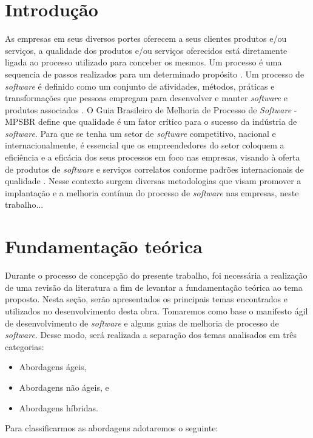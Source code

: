 \documentclass{acm_proc_article-sp}
\begin{document}
\section{Introdução}
As empresas em seus diversos portes oferecem a seus clientes produtos e/ou serviços, a qualidade dos produtos e/ou serviços oferecidos está diretamente ligada ao processo utilizado para conceber os mesmos. Um processo é uma sequencia de passos realizados para um determinado propósito \cite{ieee}. Um processo de \textit{software} é definido como um conjunto de atividades, métodos, práticas e transformações que pessoas empregam para desenvolver e manter \textit{software} e produtos associados \cite{weber}. O Guia Brasileiro de Melhoria de Processo de \textit{Software} - MPSBR define que qualidade é um fator crítico para o sucesso
da indústria de \textit{software}. Para que se tenha um setor de \textit{software} competitivo, nacional e internacionalmente, é essencial que os empreendedores do setor coloquem a eficiência e a eficácia dos seus processos em foco nas empresas,
visando à oferta de produtos de \textit{software} e serviços correlatos conforme padrões internacionais de qualidade \cite{mpsbr:nAgil}. Nesse contexto surgem diversas metodologias que visam promover a implantação e a melhoria contínua do processo de \textit{software} nas empresas, neste trabalho...

\section{Fundamentação teórica}
Durante o processo de concepção do presente trabalho, foi necessária a realização de uma revisão da literatura a fim de levantar a fundamentação teórica ao tema proposto. Nesta seção, serão apresentados os principais temas encontrados e utilizados no desenvolvimento desta obra. Tomaremos como base o manifesto ágil de desenvolvimento de \textit{software} \cite{manifesto:agil} e alguns guias de melhoria de processo de \textit{software}. Desse modo, será realizada a separação dos temas analisados em três categorias:

\begin{itemize}
\item Abordagens ágeis,
\item Abordagens não ágeis, e
\item Abordagens híbridas.
\end{itemize}

Para classificarmos as abordagens adotaremos o seguinte: 
\end{document}
